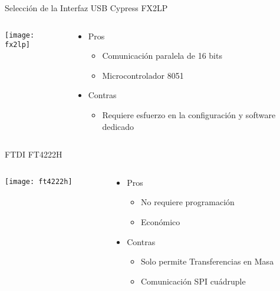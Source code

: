 \begin{frame}{Selección de la Interfaz USB}
	\alert<2>{Cypress FX2LP}
	\begin{columns}
		\begin{column}{.4\textwidth}
			\texttt{[image: fx2lp]}
		\end{column}
		\begin{column}{.6\textwidth}
			\begin{itemize}
				\item Pros
				\begin{itemize}
					\item Comunicación paralela de 16 bits
					\item Microcontrolador 8051
				\end{itemize}
				\item Contras
				\begin{itemize}
					\item Requiere esfuerzo en la configuración y software dedicado
				\end{itemize}
			\end{itemize}
		\end{column}
	\end{columns}
		
	FTDI FT4222H
	\begin{columns}
		\begin{column}{.4\textwidth}
			\texttt{[image: ft4222h]}
		\end{column}
		\begin{column}{.6\textwidth}
			\begin{itemize}
				\item Pros
				\begin{itemize}
					\item No requiere programación
					\item Económico
				\end{itemize}
				\item Contras
				\begin{itemize}
					\item Solo permite Transferencias en Masa
					\item Comunicación SPI cuádruple
				\end{itemize}
			\end{itemize}
		\end{column}
	\end{columns}

\end{frame}

